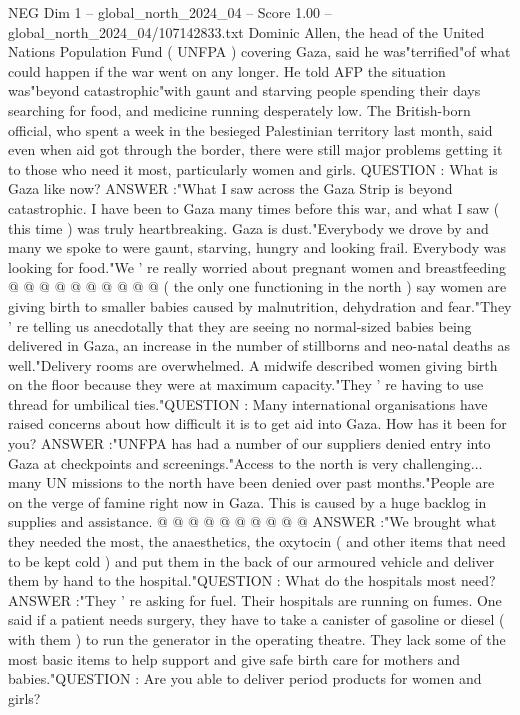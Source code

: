 \begin{textsample}{NEG Dim 1 – global\_north\_2024\_04 – Score 1.00 – global\_north\_2024\_04/107142833.txt}  \label{ex:f1_neg_302}
Dominic Allen, the head of the United Nations Population Fund ( UNFPA ) covering Gaza, said he was"terrified"of what could happen if the war went on any longer.
He told AFP the situation was"beyond catastrophic"with gaunt and starving people spending their days searching for food, and medicine running desperately low.
The British-born official, who spent a week in the besieged Palestinian territory last month, said even when aid got through the border, there were still major problems getting it to those who need it most, particularly women and girls.
QUESTION : What is Gaza like now?
ANSWER :"What I saw across the Gaza Strip is beyond catastrophic.
I have been to Gaza many times before this war, and what I saw ( this time ) was truly heartbreaking.
Gaza is dust."Everybody we drove by and many we spoke to were gaunt, starving, hungry and looking frail.
Everybody was looking for food."We ' re really worried about pregnant women and breastfeeding @ @ @ @ @ @ @ @ @ @ ( the only one functioning in the north ) say women are giving birth to smaller babies caused by malnutrition, dehydration and fear."They ' re telling us anecdotally that they are seeing no normal-sized babies being delivered in Gaza, an increase in the number of stillborns and neo-natal deaths as well."Delivery rooms are overwhelmed.
A midwife described women giving birth on the floor because they were at maximum capacity."They ' re having to use thread for umbilical ties."QUESTION : Many international organisations have raised concerns about how difficult it is to get aid into Gaza.
How has it been for you?
ANSWER :"UNFPA has had a number of our suppliers denied entry into Gaza at checkpoints and screenings."Access to the north is very challenging... many UN missions to the north have been denied over past months."People are on the verge of famine right now in Gaza.
This is caused by a huge backlog in supplies and assistance. @ @ @ @ @ @ @ @ @ @ ANSWER :"We brought what they needed the most, the anaesthetics, the oxytocin ( and other items that need to be kept cold ) and put them in the back of our armoured vehicle and deliver them by hand to the hospital."QUESTION : What do the hospitals most need?
ANSWER :"They ' re asking for fuel.
Their hospitals are running on fumes.
One said if a patient needs surgery, they have to take a canister of gasoline or diesel ( with them ) to run the generator in the operating theatre.
They lack some of the most basic items to help support and give safe birth care for mothers and babies."QUESTION : Are you able to deliver period products for women and girls?

\end{textsample}
